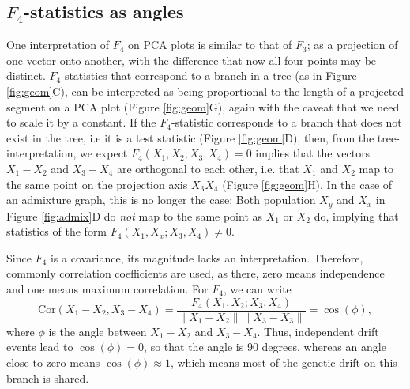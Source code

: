 \documentclass[12pt,fullpage, a4paper]{article}
\newcommand{\norm}[1]{\left\lVert#1\right\rVert}
\begin{document}
\subsection{$F_4$-statistics as angles}
One interpretation of $F_4$ on PCA plots is similar to that of $F_3$; as a projection of one vector onto another, with the difference that now all four points may be distinct. $F_4$-statistics that correspond to a branch in a tree (as in Figure \ref{fig:geom}C), can be interpreted as being proportional to the length of a projected segment on a PCA plot (Figure \ref{fig:geom}G), again with the caveat that we need to scale it by a constant. If the $F_4$-statistic corresponds to a branch that does not exist in the tree, i.e it is a test statistic (Figure \ref{fig:geom}D), then, from the tree-interpretation, we expect $F_4(X_1, X_2; X_3, X_4) = 0$ implies that the vectors $X_1 - X_2$ and $X_3 - X_4$ are orthogonal to each other, i.e. that $X_1$ and $X_2$  map to the same point on the projection axis $\overline{X_3X_4}$ (Figure \ref{fig:geom}H). In the case of an admixture graph, this is no longer the case: Both population $X_y$ and $X_x$ in Figure \ref{fig:admix}D do \emph{not} map to the same point as $X_1$ or $X_2$ do, implying that statistics of the form $F_4(X_1, X_x; X_3, X_4) \neq 0$.


Since $F_4$ is a covariance, its magnitude lacks an interpretation. Therefore, commonly correlation coefficients are used, as there, zero means independence and one means maximum correlation. For $F_4$, we can write 
\begin{equation}
\text{Cor}(X_1 - X_2, X_3 - X_4) =  \frac{F_4( X_1, X_2; X_3, X_4) }{\norm{X_1-X_2}\norm{X_3-X_3}} = \cos(\phi),\label{eq:angle}
\end{equation}
where $\phi$ is the angle between $X_1 - X_2$ and $X_3 - X_4$. Thus, independent drift events lead to $\cos(\phi) = 0$, so that the angle is 90 degrees, whereas an angle close to zero means $\cos(\phi)\approx 1$, which means most of the genetic drift on this branch is shared.
\end{document}
